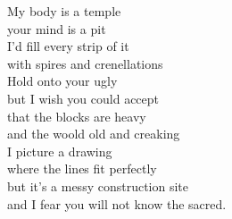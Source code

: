 My body is a temple\\
your mind is a pit\\
I'd fill every strip of it\\
with spires and crenellations\\

Hold onto your ugly\\
but I wish you could accept\\
that the blocks are heavy\\
and the woold old and creaking\\

I picture a drawing\\
where the lines fit perfectly\\
but it's a messy construction site\\
and I fear you will not know the sacred.\\


